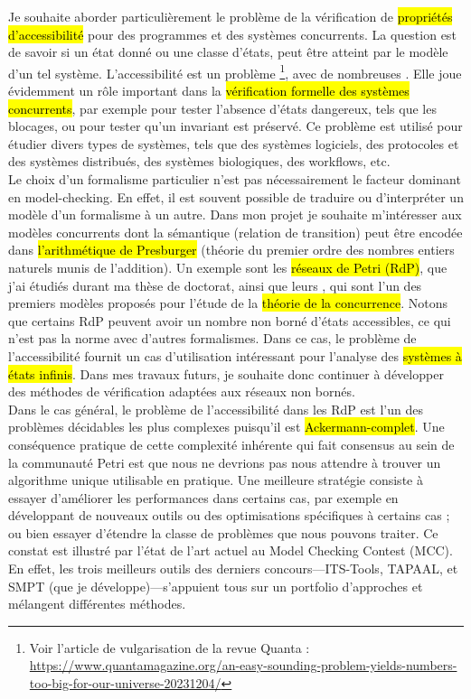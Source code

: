Je souhaite aborder particulièrement le problème de la vérification de
\hl{propriétés d'accessibilité} pour des programmes et des systèmes concurrents.
La question est de savoir si un état donné ou une classe d'états, peut être
atteint par le modèle d'un tel système. L'accessibilité est un problème
\footnote{Voir l'article de vulgarisation de la
revue Quanta :\\
\url{https://www.quantamagazine.org/an-easy-sounding-problem-yields-numbers-too-big-for-our-universe-20231204/}},
avec de nombreuses . Elle joue évidemment un rôle
important dans la \hl{vérification formelle des systèmes concurrents}, par exemple
pour tester l'absence \og d'états dangereux\fg, tels que les blocages, ou pour
tester qu'un invariant est préservé. Ce problème est utilisé pour étudier divers
types de systèmes, tels que des systèmes
logiciels,
des protocoles et des systèmes distribués, des systèmes
biologiques, des
workflows, etc.\\

Le choix d'un formalisme particulier n'est pas nécessairement le facteur
dominant en model-checking. En effet, il est souvent possible de traduire ou
d'interpréter un modèle d'un formalisme à un autre. Dans mon projet je souhaite
m'intéresser aux modèles concurrents dont la sémantique (relation de transition)
peut être encodée dans \hl{l'arithmétique de Presburger} (théorie du premier
ordre des nombres entiers naturels munis de l'addition). Un exemple sont les
\hl{réseaux de Petri (RdP)}, que j'ai étudiés durant ma thèse de doctorat, ainsi
que leurs , qui sont l'un des premiers modèles proposés pour
l'étude de la \hl{théorie de la concurrence}. Notons que certains RdP peuvent
avoir un nombre non borné d'états accessibles, ce qui n'est pas la norme avec
d'autres formalismes. Dans ce cas, le problème de l'accessibilité fournit un cas
d'utilisation intéressant pour l'analyse des \hl{systèmes à états infinis}. Dans
mes travaux futurs, je souhaite donc continuer à développer des méthodes de
vérification adaptées aux réseaux non bornés.\\

Dans le cas général, le problème de l'accessibilité dans les RdP est l'un des
problèmes décidables les plus complexes puisqu'il est \hl{Ackermann-complet}. Une
conséquence pratique de cette \og complexité inhérente \fg qui fait consensus au
sein de la communauté Petri est que nous ne devrions pas nous attendre à trouver
un algorithme unique utilisable en pratique. Une meilleure stratégie consiste à
essayer d'améliorer les performances dans certains cas, par exemple en
développant de nouveaux outils ou des optimisations spécifiques à certains cas ;
ou bien essayer d'étendre la classe de problèmes que nous pouvons traiter. 
Ce constat est illustré par l'état de l'art actuel au Model Checking Contest
(MCC). En effet, les trois meilleurs outils des derniers
concours---\textsf{ITS-Tools},
\textsf{TAPAAL}, et \textsf{SMPT}
(que je développe)---s'appuient tous sur un portfolio d'approches et mélangent
différentes méthodes.\\

